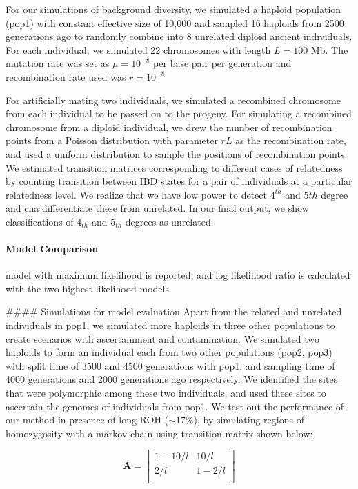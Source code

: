 \documentclass[12pt, letterpaper]{article}
\begin{document}
For our simulations of background diversity, we simulated a haploid population (pop1) with constant effective size of 10,000 and sampled 16 haploids from 2500 generations ago to randomly combine into 8 unrelated diploid ancient individuals. For each individual, we simulated 22 chromosomes with length $L=100$ Mb. The mutation rate was set as $\mu= 10^{-8}$ per base pair per generation and recombination rate used was $r=10^{-8}$ 

For artificially mating two individuals, we simulated a recombined chromosome from each individual to be passed on to the progeny. For simulating a recombined chromosome from a diploid individual, we drew the number of recombination points from a Poisson distribution with parameter $rL$ as the recombination rate, and used a uniform distribution to sample the positions of recombination points. We estimated transition matrices corresponding to different cases of relatedness by counting transition between IBD states for a pair of  individuals at a particular relatedness level. We realize that we have low power to detect $4^{th}$ and $5{th}$ degree and cna differentiate these from unrelated. In our final output, we show classifications of $4_{th}$ and $5_{th}$ degrees as unrelated.   

\paragraph{Model Comparison}
model with maximum likelihood is reported, and log likelihood ratio is calculated with the two highest likelihood models. 


#### Simulations for model evaluation
Apart from the related and unrelated individuals in pop1, we simulated more haploids in three other populations to create scenarios with ascertainment and contamination. We simulated two haploids to form an individual each from two other populations (pop2, pop3) with split time of 3500 and 4500 generations with pop1, and sampling time of 4000 generations and 2000 generations ago respectively. We identified the sites that were polymorphic among these two individuals, and used these sites to ascertain the genomes of individuals from pop1. We test out the performance of our method in presence of long ROH ($\sim17\%$), by simulating regions of homozygosity with a markov chain using transition matrix shown below: 

$$\mathbf{A} = \left[\begin{array}
{rr}
1-10/l & 10/l \\
2/l & 1-2/l  \\
\end{array}\right]
$$
\end{document}
